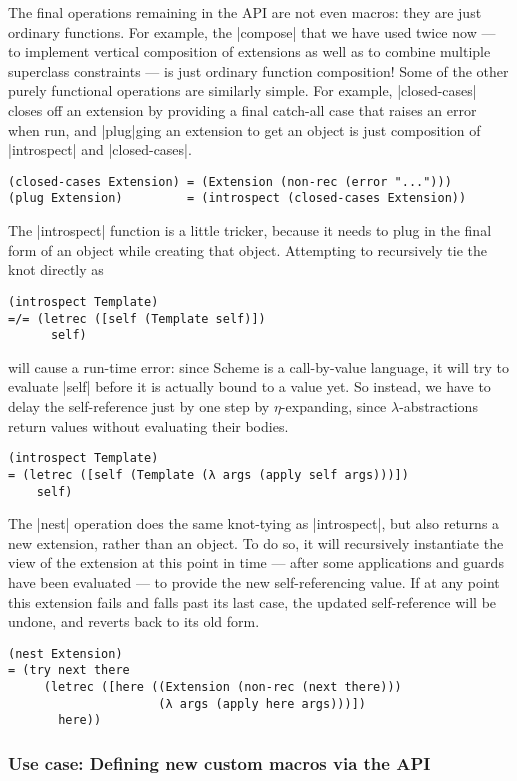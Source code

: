 The final operations remaining in the API are not even macros: they are just ordinary functions.
For example, the \scm|compose| that we have used twice now --- to implement vertical composition of extensions as well as to combine multiple superclass constraints --- is just ordinary function composition!
Some of the other purely functional operations are similarly simple.
For example, \scm|closed-cases| closes off an extension by providing a final catch-all case that raises an error when run, and \scm|plug|ging an extension to get an object is just composition of \scm|introspect| and \scm|closed-cases|.
\begin{verbatim}
(closed-cases Extension) = (Extension (non-rec (error "...")))
(plug Extension)         = (introspect (closed-cases Extension))
\end{verbatim}
The \scm|introspect| function is a little tricker, because it needs to plug in the final form of an object while creating that object.
Attempting to recursively tie the knot directly as
\begin{verbatim}
(introspect Template)
=/= (letrec ([self (Template self)])
      self)
\end{verbatim}
will cause a run-time error: since Scheme is a call-by-value language, it will try to evaluate \scm|self| before it is actually bound to a value yet.
So instead, we have to delay the self-reference just by one step by $\eta$-expanding, since $\lambda$-abstractions return values without evaluating their bodies.
\begin{verbatim}
(introspect Template)
= (letrec ([self (Template (λ args (apply self args)))])
    self)
\end{verbatim}
The \scm|nest| operation does the same knot-tying as \scm|introspect|, but also returns a new extension, rather than an object.
To do so, it will recursively instantiate the view of the extension at this point in time --- after some applications and guards have been evaluated --- to provide the new self-referencing value.
If at any point this extension fails and falls past its last case, the updated self-reference will be undone, and reverts back to its old form.
\begin{verbatim}
(nest Extension)
= (try next there
     (letrec ([here ((Extension (non-rec (next there)))
                     (λ args (apply here args)))])
       here))
\end{verbatim}

\subsubsection{Use case: Defining new custom macros via the API}

